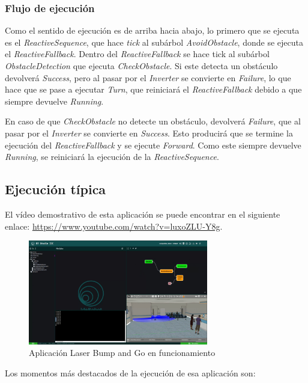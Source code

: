 \subsubsection{Flujo de ejecución}

Como el sentido de ejecución es de arriba hacia abajo, lo primero que se ejecuta es el \textit{ReactiveSequence}, que hace \textit{tick} al subárbol \textit{AvoidObstacle}, donde se ejecuta el \textit{ReactiveFallback}. Dentro del \textit{ReactiveFallback} se hace tick al subárbol \textit{ObstacleDetection} que ejecuta \textit{CheckObstacle}. Si este detecta un obstáculo devolverá \textit{Success}, pero al pasar por el \textit{Inverter} se convierte en \textit{Failure}, lo que hace que se pase a ejecutar \textit{Turn}, que reiniciará el \textit{ReactiveFallback} debido a que siempre devuelve \textit{Running}.

En caso de que \textit{CheckObstacle} no detecte un obstáculo, devolverá \textit{Failure}, que al pasar por el \textit{Inverter} se convierte en \textit{Success}. Esto producirá que se termine la ejecución del \textit{ReactiveFallback} y se ejecute \textit{Forward}. Como este siempre devuelve \textit{Running}, se reiniciará la ejecución de la \textit{ReactiveSequence}. 

\subsection{Ejecución típica}

El vídeo demostrativo de esta aplicación se puede encontrar en el siguiente enlace: \url{https://www.youtube.com/watch?v=luxoZLU-Y8g}.

\begin{figure}[H]
    \centering
    \includegraphics[width=0.7\textwidth]{figures/validation/bump-teaser.jpg}
    \caption{Aplicación Laser Bump and Go en funcionamiento}
    \label{fig:ejemplo}
\end{figure}

\noindent Los momentos más destacados de la ejecución de esa aplicación son:

